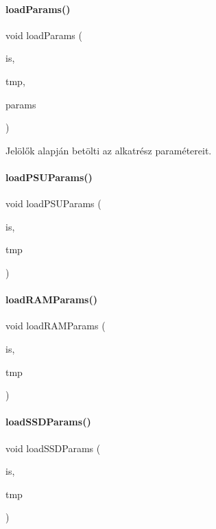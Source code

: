 \paragraph{\texorpdfstring{loadParams()}{loadParams()}}
{\footnotesize\ttfamily void load\+Params (\begin{DoxyParamCaption}\item[{std\+::fstream \&}]{is,  }\item[{\mbox{\hyperlink{struct_temp_input}{Temp\+Input}} \&}]{tmp,  }\item[{int const}]{params }\end{DoxyParamCaption})}



Jelölők alapján betölti az alkatrész paramétereit. 

\mbox{\label{_inventory_8h_a198252da076147a0ef1f4d721bdb2219}} 
\paragraph{\texorpdfstring{loadPSUParams()}{loadPSUParams()}}
{\footnotesize\ttfamily void load\+P\+S\+U\+Params (\begin{DoxyParamCaption}\item[{std\+::istream \&}]{is,  }\item[{\mbox{\hyperlink{struct_temp_input}{Temp\+Input}} \&}]{tmp }\end{DoxyParamCaption})}

\mbox{\label{_inventory_8h_aec5377baa2a6064a69b04423103d85ea}} 
\paragraph{\texorpdfstring{loadRAMParams()}{loadRAMParams()}}
{\footnotesize\ttfamily void load\+R\+A\+M\+Params (\begin{DoxyParamCaption}\item[{std\+::istream \&}]{is,  }\item[{\mbox{\hyperlink{struct_temp_input}{Temp\+Input}} \&}]{tmp }\end{DoxyParamCaption})}

\mbox{\label{_inventory_8h_ac358a7371dcac8ed9d7aba003099c193}} 
\paragraph{\texorpdfstring{loadSSDParams()}{loadSSDParams()}}
{\footnotesize\ttfamily void load\+S\+S\+D\+Params (\begin{DoxyParamCaption}\item[{std\+::istream \&}]{is,  }\item[{\mbox{\hyperlink{struct_temp_input}{Temp\+Input}} \&}]{tmp }\end{DoxyParamCaption})}

